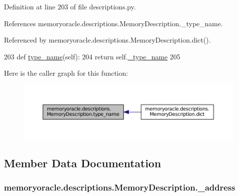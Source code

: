 Definition at line 203 of file descriptions.\+py.



References memoryoracle.\+descriptions.\+Memory\+Description.\+\_\+type\+\_\+name.



Referenced by memoryoracle.\+descriptions.\+Memory\+Description.\+dict().


\begin{DoxyCode}
203     \textcolor{keyword}{def }\hyperlink{classmemoryoracle_1_1descriptions_1_1MemoryDescription_aa67a52a7ce77ac27d2d2e2d7818c9ffc}{type\_name}(self):
204         \textcolor{keywordflow}{return} self.\hyperlink{classmemoryoracle_1_1descriptions_1_1MemoryDescription_a340a0f8c90bf3c2d80323327d706ee1b}{\_type\_name}
205 
\end{DoxyCode}


Here is the caller graph for this function\+:
\nopagebreak
\begin{figure}[H]
\begin{center}
\leavevmode
\includegraphics[width=350pt]{classmemoryoracle_1_1descriptions_1_1MemoryDescription_aa67a52a7ce77ac27d2d2e2d7818c9ffc_icgraph}
\end{center}
\end{figure}




\subsection{Member Data Documentation}
\hypertarget{classmemoryoracle_1_1descriptions_1_1MemoryDescription_a06750833f49f1de99914f927c534d997}{}
\subsubsection[{\+\_\+address}]{\setlength{\rightskip}{0pt plus 5cm}memoryoracle.\+descriptions.\+Memory\+Description.\+\_\+address\hspace{0.3cm}{\ttfamily [private]}}\label{classmemoryoracle_1_1descriptions_1_1MemoryDescription_a06750833f49f1de99914f927c534d997}


